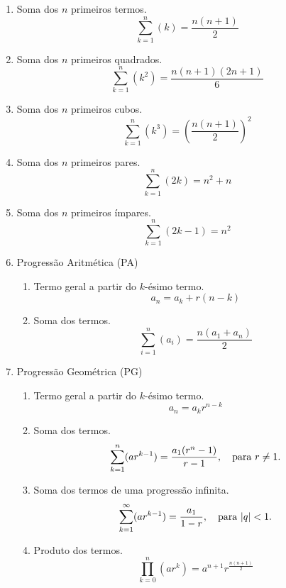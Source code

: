 \begin{multicols}{2}
	\begin{enumerate}
		\item Soma dos $n$ primeiros termos.
		      $$\sum_{k = 1}^{n} (k) = \frac{n(n+1)}{2}$$

		\item Soma dos $n$ primeiros quadrados.
		      $$\sum_{k = 1}^{n} (k^2) = \frac{n(n+1)(2n+1)}{6}$$

		\item Soma dos $n$ primeiros cubos.
		      $$\sum_{k = 1}^{n} (k^3) = (\frac{n(n+1)}{2})^{2}$$

		\item Soma dos $n$ primeiros pares.
		      $$\sum_{k = 1}^{n} (2k) = n^2 + n$$

		\item Soma dos $n$ primeiros ímpares.
		      $$\sum_{k = 1}^{n} (2k - 1) = n^2$$

		\item Progressão Aritmética (PA)
		      \begin{enumerate}
			      \item Termo geral a partir do $k$-ésimo termo.
			            $$a_n = a_k + r(n-k)$$

			      \item Soma dos termos.
			            $$\sum_{i = 1}^{n} (a_i) = \frac{n(a_1+a_n)}{2}$$
		      \end{enumerate}

		\item Progressão Geométrica (PG)
		      \begin{enumerate}
			      \item Termo geral a partir do $k$-ésimo termo.
			            $$a_n = a_k r^{n-k}$$

			      \item Soma dos termos.
			            $$\sum_{k = 1}^{n} (ar^{k-1}) = \frac{a_1(r^n - 1)}{r - 1}, \quad \textnormal{para } r \neq 1.$$

			      \item Soma dos termos de uma progressão infinita.
			            $$\sum_{k = 1}^{\infty} (ar^{k-1}) = \frac{a_1}{1 - r}, \quad \textnormal{para } |q| < 1.$$

			      \item Produto dos termos.
			            $$\prod_{k = 0}^{n} (ar^k) = a^{n+1}r^{\frac{n(n+1)}{2}}$$
		      \end{enumerate}

	\end{enumerate}
\end{multicols}
